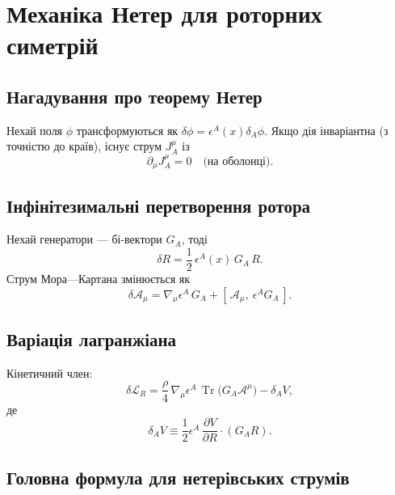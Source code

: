 \documentclass[11pt,a4paper]{article}
\numberwithin{equation}{section}
\theoremstyle{plain}
\theoremstyle{definition}
\theoremstyle{remark}
\DeclareMathOperator{\Tr}{Tr}
\begin{document}
\section{Механіка Нетер для роторних симетрій}
\label{sec:noether}

\subsection{Нагадування про теорему Нетер}

Нехай поля $\phi$ трансформуються як $\delta\phi=\epsilon^A(x)\delta_A\phi$. Якщо дія інваріантна (з точністю до країв), існує струм $J^\mu_A$ із
\begin{equation}
\partial_\mu J^\mu_A = 0 \quad \text{(на оболонці)}.
\end{equation}

\subsection{Інфінітезимальні перетворення ротора}

Нехай генератори — бі-вектори $G_A$, тоді
\begin{equation}
\delta R = \frac{1}{2}\,\epsilon^A(x)\,G_A\,R.
\label{eq:deltaR}
\end{equation}
Струм Мора—Картана змінюється як
\begin{equation}
\delta \mathcal{A}_\mu = \nabla_\mu\epsilon^A\, G_A + [\,\mathcal{A}_\mu,\ \epsilon^A G_A\,].
\label{eq:deltaA}
\end{equation}

\subsection{Варіація лагранжіана}

Кінетичний член:
\begin{equation}
\delta \mathcal{L}_R = \frac{\rho}{4}\, \nabla_\mu \epsilon^A \,\Tr\!\big(G_A\mathcal{A}^\mu\big) - \delta_A V,
\label{eq:deltaL}
\end{equation}
де
\begin{equation}
\delta_A V \equiv \frac{1}{2}\epsilon^A\,\frac{\partial V}{\partial R}\cdot (G_A R).
\end{equation}

\subsection{Головна формула для нетерівських струмів}
\end{document}
